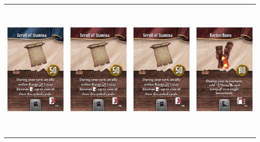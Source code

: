 \documentclass{minimal}
\begin{document}
{\begin{longtable}{llll}
\includegraphics[width=44mm,height=68mm]{./64-151/gh-095a-scroll-of-stamina.png} &
\includegraphics[width=44mm,height=68mm]{./64-151/gh-095b-scroll-of-stamina.png} &
\includegraphics[width=44mm,height=68mm]{./64-151/gh-095b-scroll-of-stamina.png} &
\includegraphics[width=44mm,height=68mm]{./64-151/gh-096-rocket-boots.png}\\ 

\end{longtable}}
\end{document}
